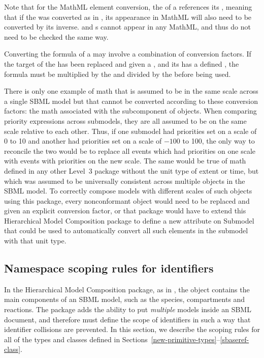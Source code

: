 Note that for the MathML  element conversion,
the  of a \Reaction references its \KineticLaw, meaning that if
the \KineticLaw was converted as in , its appearance
in MathML will also need to be converted by its inverse.  \AssignmentRule and \RateRule
{}s cannot appear in any MathML, and thus do not need to be checked
the same way.

Converting the formula of a \RateRule may involve a combination of conversion factors.
If the target of the \RateRule has been replaced
and given a , and its \Submodel has a defined 
, the formula must be multiplied by the 
and divided by the  before being used.

There is only one example of math that is assumed to be in the same scale
across a single SBML model but that cannot be converted according to
these conversion factors:  the math associated with the \Priority
subcomponent of \Event objects.  When comparing priority expressions 
across submodels,
they are all assumed to be on the same scale relative to each other.
Thus, if one submodel had priorities set on a scale of 0 to 10 and another had
priorities set on a scale of $-100$ to 100, the only way to reconcile the 
two would be to replace all events which had priorities on one scale with
events with priorities on the new scale.
The same would be true of math defined in any other Level~3 package
without the unit type of extent or time, but which was assumed to
be universally consistent across multiple objects in the SBML model.
To correctly compose models with different scales of such objects using
this package, every nonconformant object would need to be replaced and
given an explicit conversion factor, or that package would have to
extend this Hierarchical Model Composition package to define a new
attribute on Submodel that could be used to automatically convert all
such elements in the submodel with that unit type.


\clearpage

\subsection{Namespace scoping rules for identifiers}
\label{namespaces}

In the Hierarchical Model Composition package, as in \sbmlthreecore,
the \Model object contains the main components of an
SBML model, such as the species, compartments and reactions.  The
package adds the ability to put \emph{multiple} models inside an SBML
document, and therefore must define the scope of identifiers in such a
way that identifier collisions are prevented.  In this section, we
describe the scoping rules for all of the types and classes defined in
Sections~\ref{new-primitive-types}--\ref{sbaseref-class}.

